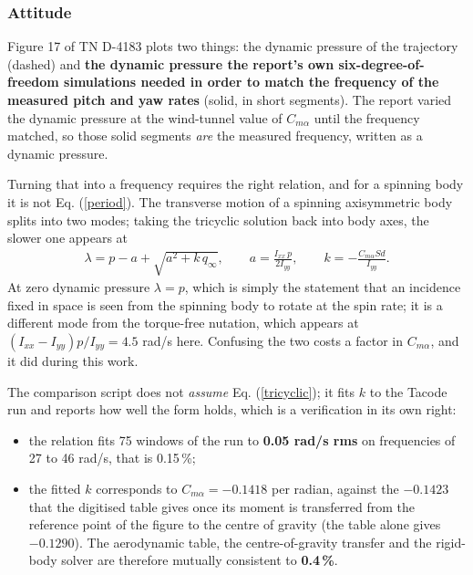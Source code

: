 \documentclass[11pt,a4paper]{article}
\begin{document}
\subsubsection{Attitude} \label{fire2_attitude}

Figure 17 of TN D-4183 plots two things: the dynamic pressure of the trajectory (dashed)
and \textbf{the dynamic pressure the report's own six-degree-of-freedom simulations needed
in order to match the frequency of the measured pitch and yaw rates} (solid, in short
segments). The report varied the dynamic pressure at the wind-tunnel value of
$C_{m\alpha}$ until the frequency matched, so those solid segments \emph{are} the measured
frequency, written as a dynamic pressure.

Turning that into a frequency requires the right relation, and for a spinning body it is
not Eq. (\ref{period}). The transverse motion of a spinning axisymmetric body splits into
two modes; taking the tricyclic solution \cite{Murphy1963} back into body axes, the slower
one appears at
%
\begin{align}
	\lambda = p - a + \sqrt{a^2 + k \, q_{\infty}} ,
	\qquad
	a = \frac{I_{xx} \, p}{2 I_{yy}} ,
	\qquad
	k = - \frac{ C_{m\alpha} S d }{ I_{yy} } .
	\label{tricyclic}
\end{align}
%
At zero dynamic pressure $\lambda = p$, which is simply the statement that an incidence
fixed in space is seen from the spinning body to rotate at the spin rate; it is a
different mode from the torque-free nutation, which appears at
$(I_{xx} - I_{yy}) p / I_{yy} = 4.5$ rad/s here. Confusing the two costs a factor in
$C_{m\alpha}$, and it did during this work.

The comparison script does not \emph{assume} Eq. (\ref{tricyclic}); it fits $k$ to the
Tacode run and reports how well the form holds, which is a verification in its own right:

\begin{itemize}
\item the relation fits 75 windows of the run to \textbf{0.05 rad/s rms} on frequencies of
27 to 46 rad/s, that is 0.15\,\%;
\item the fitted $k$ corresponds to $C_{m\alpha} = -0.1418$ per radian, against the
$-0.1423$ that the digitised table gives once its moment is transferred from the reference
point of the figure to the centre of gravity (the table alone gives $-0.1290$). The
aerodynamic table, the centre-of-gravity transfer and the rigid-body solver are therefore
mutually consistent to \textbf{0.4\,\%}.
\end{itemize}
\end{document}
